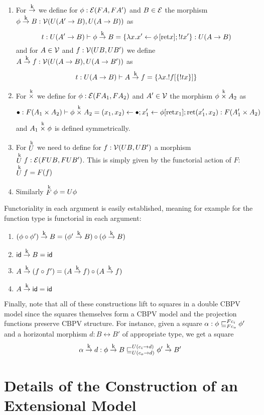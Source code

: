 \begin{enumerate}
\item For $\tok$ we define for $\phi : \calE(F A,F A')$ and $B \in \calE$ the morphism $\phi \tok B : \calV(U(A' \to B),U(A\to B))$ as
  \[ t:U(A'\to B) \vdash \phi \tok B = \{ \lambda x. x' \leftarrow \phi\,[\ret x]; ! t x'\} : U(A \to B) \]
  and for $A \in \calV$ and $f : \calV(UB,UB')$ we define $A \tok f : \calV(U(A \to B),U(A\to B'))$ as
  \[ t : U(A \to B) \vdash A \tok f = \{ \lambda x. !f[\{ ! t x \}]\} \]
\item For $\timesk$ we define for $\phi : \calE(F A_1,FA_2)$ and $A' \in \calV$ the morphism $\phi \timesk A_2$ as
  \[ \bullet : F(A_1\times A_2) \vdash \phi \timesk A_2 = (x_1,x_2) \leftarrow \bullet; x_1' \leftarrow \phi[\ret x_1]; \ret (x_1',x_2) : F(A_1'\times A_2)\]
  and $A_1 \timesk \phi$ is defined symmetrically.
\item For $\Uk$ we need to define for $f : \calV(UB,UB')$ a morphism $\Uk f : \calE(FUB,FUB')$. This is simply given by the functorial action of $F$: $\Uk f = F(f)$
\item Similarly $\Fk \phi = U\phi$
\end{enumerate}

Functoriality in each argument is easily established, meaning for
example for the function type is functorial in each argument:
\begin{enumerate}
\item $(\phi \circ \phi') \tok B = (\phi' \tok B) \circ (\phi \tok B)$
\item $\id \tok B = \id$
\item $A \tok (f \circ f') = (A \tok f) \circ (A \tok f)$
\item $A \tok \id = \id$
\end{enumerate}

Finally, note that all of these constructions lift to squares in a
double CBPV model since the squares themselves form a CBPV model and
the projection functions preserve CBPV structure. For instance, given a square
$\alpha : \phi \ltdyn_{F c_o}^{F c_i} \phi'$ and a horizontal morphism $d : B \rel B'$ of appropriate type, we get a square
\[ \alpha \tok d : \phi \tok B \ltdyn_{U(c_o \to d)}^{U(c_i \to d)} \phi' \tok B' \]

\section{Details of the Construction of an Extensional Model}

